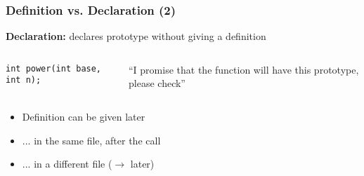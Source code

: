 \begin{frame}[fragile]
  \frametitle{Definition vs. Declaration (2)}

  \textbf{Declaration:} declares prototype without giving a definition

  \begin{block}{}
    \begin{columns}[c]
      \begin{column}{.5\textwidth}
        \begin{block}{}
\begin{verbatim}
int power(int base, int n);
\end{verbatim}
        \end{block}
      \end{column}
      \begin{column}{.4\textwidth}
        ``I promise that the function will have this prototype, please
        check''
      \end{column}
    \end{columns}
  \end{block}

  \begin{itemize}
  \item Definition can be given later
  \item ... in the same file, after the call
  \item ... in a different file ($\to$ later)
  \end{itemize}

\end{frame}


